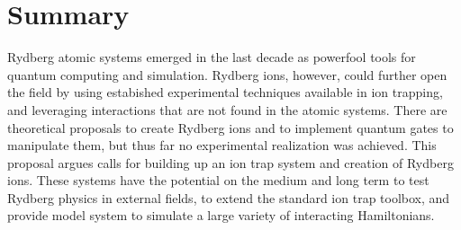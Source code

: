 
\section{Summary}

Rydberg atomic systems emerged in the last decade as powerfool tools for quantum computing and simulation. Rydberg ions, however, could further open the field by using estabished experimental techniques available in ion trapping, and leveraging interactions that are not found in the atomic systems. There are theoretical proposals to create Rydberg ions and to implement quantum gates to manipulate them, but thus far no experimental realization was achieved. This proposal argues calls for building up an ion trap system and creation of Rydberg ions. These systems have the potential on the medium and long term to test Rydberg physics in external fields, to extend the standard ion trap toolbox, and provide model system to simulate a large variety of interacting Hamiltonians.



